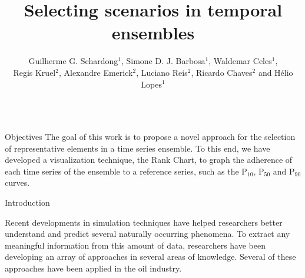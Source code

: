 \documentclass[final]{beamer}
\title{Selecting scenarios in temporal ensembles}
\author{Guilherme G. Schardong$^1$, Simone D. J. Barbosa$^1$, Waldemar Celes$^1$, \\
Regis Kruel$^2$, Alexandre Emerick$^2$, Luciano Reis$^2$, Ricardo Chaves$^2$ and H\'{e}lio Lopes$^1$}
\institute{$^1$Departamento de Inform\'{a}tica - PUC-Rio\\
$^2$PETROBRAS}
\newlength{\sepwid}
\newlength{\twocolwid}
\begin{document}

\setlength{\belowcaptionskip}{1ex} %
\setlength\belowdisplayshortskip{1ex} %

\begin{frame}[t] %

\begin{columns}[t] %


\begin{column}{\twocolwid}\vspace{-.3in} %


\begin{alertblock}{Objectives}
The goal of this work is to propose a novel approach for the selection of representative elements in a time series ensemble. To this end, we have developed a visualization technique, the Rank Chart, to graph the adherence of each time series of the ensemble to a reference series, such as the P$_{10}$, P$_{50}$ and P$_{90}$ curves.
\end{alertblock}


\begin{block}{Introduction}

Recent developments in simulation techniques have helped researchers better understand and predict several naturally occurring phenomena. To extract any meaningful information from this amount of data, researchers have been developing an array of approaches in several areas of knowledge. Several of these approaches have been applied in the oil industry.


\end{block}
\end{column}
\end{columns}
\end{frame}
\end{document}
